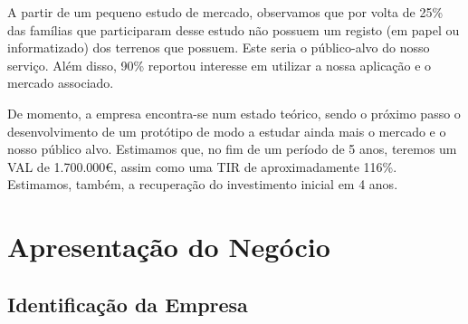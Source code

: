 \documentclass[11pt]{article}
\begin{document}
	A partir de um pequeno estudo de mercado, observamos que por volta de 25\% das famílias que participaram desse estudo não possuem um registo (em papel ou informatizado) dos terrenos que possuem. Este seria o público-alvo do nosso serviço. Além disso, 90\% reportou interesse em utilizar a nossa aplicação e o mercado associado.
	
	De momento, a empresa encontra-se num estado teórico, sendo o próximo passo o desenvolvimento de um protótipo de modo a estudar ainda mais o mercado e o nosso público alvo. Estimamos que, no fim de um período de 5 anos, teremos um VAL de 1.700.000€, assim como uma TIR de aproximadamente 116\%. Estimamos, também, a recuperação do investimento inicial em 4 anos.
	
	\pagebreak
	
	\large
	\section{Apresentação do Negócio}
	\subsection{Identificação da Empresa}
	
	\normalsize
	
\end{document}
